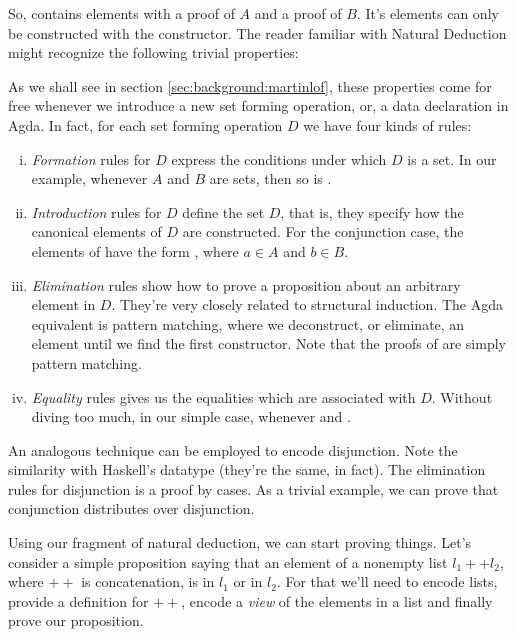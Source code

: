 
So,  contains elements with a proof of $A$ and a proof of $B$. It's elements
can only be constructed with the \IC{<\_,\_>} constructor. The reader familiar with Natural Deduction
might recognize the following trivial properties:


As we shall see in section \ref{sec:background:martinlof}, these properties come for free whenever we introduce 
a new set forming operation, or, a data declaration in Agda. In fact, for each set forming operation $D$
we have four kinds of rules:
\begin{enumerate}[i)]
  \item \emph{Formation} rules for $D$ express the conditions under which $D$ is a set.
        In our example, whenever $A$ and $B$ are sets, then so is .
  \item \emph{Introduction} rules for $D$ define the set $D$, that is, they specify how the
        canonical elements of $D$ are constructed. For the conjunction case, 
        the elements of  have the form , where $a \in A$
        and $b \in B$. 
  \item \emph{Elimination} rules show how to prove a proposition about an arbitrary element in $D$.
        They're very closely related to structural induction. The Agda equivalent is pattern matching,
        where we deconstruct, or eliminate, an element until we find the first constructor. Note that
        the proofs of  are simply pattern matching.
  \item \emph{Equality} rules gives us the equalities which are associated with $D$. Without diving
        too much, in our simple case,  whenever 
        and .
\end{enumerate}

An analogous technique can be employed to encode disjunction. Note the similarity with
Haskell's  datatype (they're the same, in fact). The elimination rules for
disjunction is a proof by cases. As a trivial example, we can prove that conjunction distributes
over disjunction.


Using our fragment of natural deduction, we can start proving things. Let's consider a simple
proposition saying that an element of a nonempty list $l_1 ++ l_2$, where $++$ is concatenation, is
in $l_1$ or in $l_2$. For that we'll need to encode lists, provide a definition for $++$,
encode a \emph{view} of the elements in a list and finally prove our proposition.

